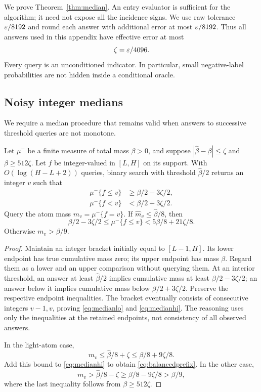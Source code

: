 We prove Theorem~\ref{thm:median}. An entry evaluator is sufficient for the algorithm; it need not expose all the incidence signs. We use raw tolerance $\varepsilon/8192$ and round each answer with additional error at most $\varepsilon/8192$. Thus all answers used in this appendix have effective error at most
\begin{equation}
 \zeta=\varepsilon/4096.
\label{eq:zeta}
\end{equation}
Every query is an unconditioned indicator. In particular, small negative-label probabilities are not hidden inside a conditional oracle.

\subsection{Noisy integer medians}
We require a median procedure that remains valid when answers to successive threshold queries are not monotone.

\begin{lemma}
\label{lem:noisymedian}
Let $\mu^-$ be a finite measure of total mass $\beta>0$, and suppose $|\hat\beta-\beta|\le\zeta$ and $\beta\ge512\zeta$. Let $f$ be integer-valued in $[L,H]$ on its support. With $O(\log(H-L+2))$ queries, binary search with threshold $\hat\beta/2$ returns an integer $v$ such that
\begin{align}
 \mu^-\{f\le v\}&\ge\beta/2-3\zeta/2,\label{eq:medianlo}\\
 \mu^-\{f<v\}&<\beta/2+3\zeta/2.\label{eq:medianhi}
\end{align}
Query the atom mass $m_v=\mu^-\{f=v\}$. If $\hat m_v\le\hat\beta/8$, then
\begin{equation}
 \beta/2-3\zeta/2\le\mu^-\{f\le v\}
 <5\beta/8+21\zeta/8.
\label{eq:balancedprefix}
\end{equation}
Otherwise $m_v>\beta/9$.
\end{lemma}

\begin{proof}
Maintain an integer bracket initially equal to $[L-1,H]$. Its lower endpoint has true cumulative mass zero; its upper endpoint has mass $\beta$. Regard them as a lower and an upper comparison without querying them. At an interior threshold, an answer at least $\hat\beta/2$ implies cumulative mass at least $\beta/2-3\zeta/2$; an answer below it implies cumulative mass below $\beta/2+3\zeta/2$. Preserve the respective endpoint inequalities. The bracket eventually consists of consecutive integers $v-1,v$, proving \eqref{eq:medianlo} and \eqref{eq:medianhi}. The reasoning uses only the inequalities at the retained endpoints, not consistency of all observed answers.

In the light-atom case,
\[
 m_v\le\hat\beta/8+\zeta\le\beta/8+9\zeta/8.
\]
Add this bound to \eqref{eq:medianhi} to obtain \eqref{eq:balancedprefix}. In the other case,
\[
 m_v>\hat\beta/8-\zeta\ge\beta/8-9\zeta/8>\beta/9,
\]
where the last inequality follows from $\beta\ge512\zeta$.
\end{proof}

